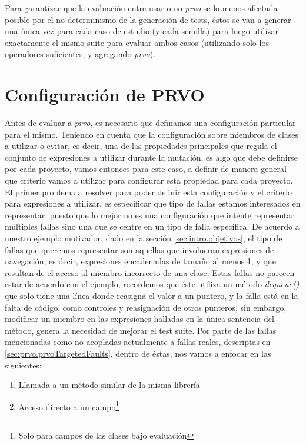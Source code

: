 Para garantizar que la evaluaci\'on entre usar o no \emph{prvo} se lo menos afectada posible por el no determinismo de la generaci\'on de tests, \'estos se van a generar una \'unica vez para cada caso de estudio (y cada semilla) para luego utilizar exactamente el mismo suite para evaluar ambos casos (utilizando solo los operadores suficientes, y agregando \emph{prvo}).

\section{Configuraci\'on de PRVO}
\label{sec:evaluation.prvoconfig}

Antes de evaluar a \emph{prvo}, es necesario que definamos una configuraci\'on particular para el mismo. Teniendo en cuenta que la configuraci\'on sobre miembros de clases a utilizar o evitar, es decir, una de las propiedades principales que regula el conjunto de expresiones a utilizar durante la mutaci\'on, es algo que debe definirse por cada proyecto, vamos entonces para este caso, a definir de manera general que criterio vamos a utilizar para configurar esta propiedad para cada proyecto. El primer problema a resolver para poder definir esta configuraci\'on y el criterio para expresiones a utilizar, es especificar que tipo de fallas estamos interesados en representar, puesto que lo mejor no es una configuraci\'on que intente representar m\'ultiples fallas sino una que se centre en un tipo de falla espec\'ifica. De acuerdo a nuestro ejemplo motivador, dado en la secci\'on \ref{sec:intro.objetivos}, el tipo de fallas que queremos representar son aquellas que involucran expresiones de navegaci\'on, es decir, expresiones encadenadas de tama\~no al menos 1, y que resultan de el acceso al miembro incorrecto de una clase. Estas fallas no parecen estar de acuerdo con el ejemplo, recordemos que \'este utiliza un m\'etodo \emph{dequeue()} que solo tiene una l\'inea donde reasigna el valor a un puntero, y la falla est\'a en la falta de c\'odigo, como controles y reasignaci\'on de otros punteros, sin embargo, modificar un miembro en las expresiones halladas en la \'unica sentencia del m\'etodo, genera la necesidad de mejorar el test suite. Por parte de las fallas mencionadas como no acopladas actualmente a fallas reales, descriptas en \ref{sec:prvo.prvoTargetedFaults}, dentro de \'estas, nos vamos a enfocar en las siguientes:

\begin{enumerate}[label=\arabic*), leftmargin=.75cm,align=left]
	\item Llamada a un m\'etodo similar de la misma librer\'ia
	\item Acceso directo a un campo\footnote{Solo para campos de las clases bajo evaluaci\'on}
\end{enumerate}

